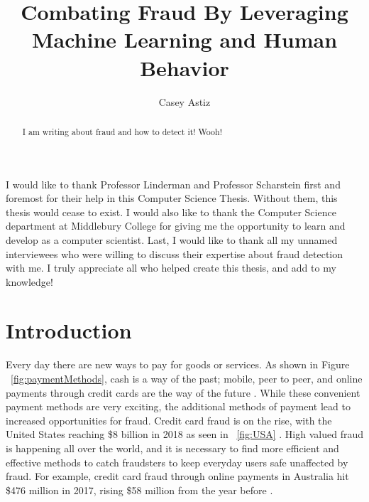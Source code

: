 \documentclass[midd]{thesis}
\title {Combating Fraud By Leveraging Machine Learning and Human Behavior}
\author {Casey Astiz}
\begin{document}
\maketitle
{}

\begin{abstract}
I am writing about fraud and how to detect it! Wooh!
\end{abstract}

\begin{acknowledgements}
I would like to thank Professor Linderman and Professor Scharstein first and foremost for their help in this Computer Science Thesis. Without them, this thesis would cease to exist. I would also like to thank the Computer Science department at Middlebury College for giving me the opportunity to learn and develop as a computer scientist. Last, I would like to thank all my unnamed interviewees who were willing to discuss their expertise about fraud detection with me. I truly appreciate all who helped create this thesis, and add to my knowledge!

\end{acknowledgements}

\contentspage
\tablelistpage   
\figurelistpage

\normalspacing \setcounter{page}{1} 

\chapter{Introduction}
\label{sec:intro}


Every day there are new ways to pay for goods or services. As shown in Figure ~\ref{fig:paymentMethods}, cash is a way of the past; mobile, peer to peer, and online payments through credit cards are the way of the future \cite{paymentMethods}. While these convenient payment methods are very exciting, the additional methods of payment lead to increased opportunities for fraud. Credit card fraud is on the rise, with the United States reaching \$8 billion in 2018 as seen in ~\ref{fig:USA}  \cite{USA}. High valued fraud is happening all over the world, and it is necessary to find more efficient and effective methods to catch fraudsters to keep everyday users safe unaffected by fraud. For example, credit card fraud through online payments in Australia hit \$476 million in 2017, rising \$58 million from the year before \cite{Wang2018}. 
\end{document}
